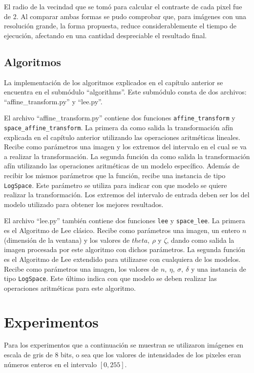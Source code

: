 El radio de la vecindad que se tom\'o para calcular el contraste de cada pixel fue de 2. Al comparar ambas formas se pudo comprobar que, para im\'agenes con una resoluci\'on grande, la forma propuesta, reduce considerablemente el tiempo de ejecuci\'on, afectando en una cantidad despreciable el resultado final.

\subsection{Algoritmos}

La implementaci\'on de los algoritmos explicados en el cap\'itulo anterior se encuentra en el subm\'odulo ``algorithms''. Este subm\'odulo consta de dos archivos: ``affine\_transform.py'' y ``lee.py''. 

El archivo ``affine\_transform.py'' contiene dos funciones \verb|affine_transform| y \verb|space_affine_transform|. La primera da como salida la transformaci\'on af\'in explicada en el cap\'itulo anterior utilizando las operaciones aritm\'eticas lineales. Recibe como par\'ametros una imagen y los extremos del intervalo en el cual se va a realizar la transformaci\'on. La segunda funci\'on da como salida la transformaci\'on af\'in utilizando las operaciones aritm\'eticas de un modelo espec\'ifico. Adem\'as de recibir los mismos par\'ametros que la funci\'on, recibe una instancia de tipo \verb|LogSpace|. Este par\'ametro se utiliza para indicar con que modelo se quiere realizar la transformaci\'on. Los extremos del intervalo de entrada deben ser los del modelo utilizado para obtener los mejores resultados.

El archivo ``lee.py'' tambi\'en contiene dos funciones \verb|lee| y \verb|space_lee|. La primera es el Algoritmo de Lee cl\'asico. Recibe como par\'ametros una imagen, un entero $n$ (dimensi\'on de la ventana) y los valores de $theta,~\rho$ y $\zeta$, dando como salida la imagen procesada por este algoritmo con dichos par\'ametros. La segunda funci\'on es el Algoritmo de Lee extendido para utilizarse con cualquiera de los modelos. Recibe como par\'ametros una imagen, los valores de $n,~\eta,~\sigma,~\delta$ y una instancia de tipo \verb|LogSpace|. Este \'ultimo indica con que modelo se deben realizar las operaciones aritm\'eticas para este algoritmo.

\section{Experimentos}
Para los experimentos que a continuaci\'on se muestran se utilizaron im\'agenes en escala de gris de 8 bits, o sea que los valores de intensidades de los pixeles eran n\'umeros enteros en el intervalo $[0,255]$.  

